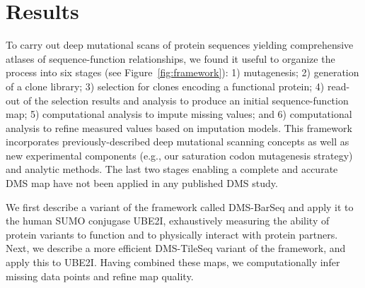 \section{Results}

To carry out deep mutational scans of protein sequences yielding comprehensive atlases of sequence-function relationships, we found it useful to organize the process into six stages (see Figure~\ref{fig:framework}): 1) mutagenesis; 2) generation of a clone library; 3) selection for clones encoding a functional protein; 4) read-out of the selection results and analysis to produce an initial sequence-function map; 5) computational analysis to impute missing values; and 6) computational analysis to refine measured values based on imputation models. This framework incorporates previously-described deep mutational scanning concepts as well as new experimental components (e.g., our saturation codon mutagenesis strategy) and analytic methods.  The last two stages enabling a complete and accurate DMS map have not been applied in any published DMS study.

We first describe a variant of the framework called DMS-BarSeq and apply it to the human SUMO conjugase UBE2I, exhaustively measuring the ability of protein variants to function and to physically interact with protein partners.  Next, we describe a more efficient DMS-TileSeq variant of the framework, and apply this to UBE2I.  Having combined these maps, we computationally infer missing data points and refine map quality.


